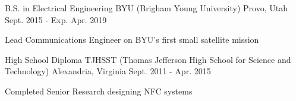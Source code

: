 

\begin{cventries}

  \cventry
  {B.S. in Electrical Engineering} %
  {BYU (Brigham Young University)} %
  {Provo, Utah} %
  {Sept. 2015 - Exp. Apr. 2019} %
    {
      \begin{cvitems} %
      \item {Lead Communications Engineer on BYU's first small satellite mission}
      \end{cvitems}
    }

  \cventry
  {High School Diploma} %
  {TJHSST (Thomas Jefferson High School for Science and Technology)} %
  {Alexandria, Virginia} %
  {Sept. 2011 - Apr. 2015} %
    {
      \begin{cvitems} %
      \item {Completed Senior Research designing NFC systems}
      \end{cvitems}
    }

\end{cventries}
